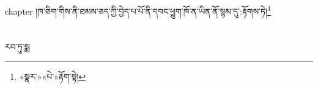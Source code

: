 chapter{ }།ཁ་ཅིག་གིས་ནི་ཐམས་ཅད་ཀྱི་བྱེད་པ་པོ་ནི་དབང་ཕྱུག་ཁོ་ན་ཡིན་ནོ་སྙམ་དུ་:རྟོགས་ཏེ།\footnote{«སྣར་»«པེ་»རྟོག་སྟེ།}\chapter{ }རབ་ཏུ་སྨ
